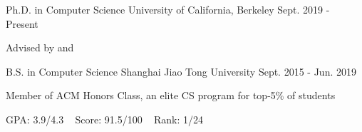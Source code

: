 
\begin{cventries}

  \cventry
	{Ph.D. in Computer Science} %
	{University of California, Berkeley} %
	{Sept. 2019 - Present} %
	{} %
	{
		\begin{cvitems} %
			\item {Advised by   and }
		\end{cvitems}
	}

  \cventry
    {B.S. in Computer Science} %
    {Shanghai Jiao Tong University} %
    {Sept. 2015 - Jun. 2019} %
    {} %
    {
    \begin{cvitems} %
    	\item {Member of ACM Honors Class, an elite CS program for top-5\% of students}
    	\item {GPA: 3.9/4.3 ~ Score: 91.5/100 ~ Rank: 1/24}
    \end{cvitems}
    }

\end{cventries}
